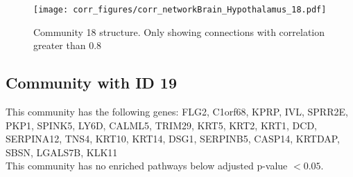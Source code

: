 \begin{figure}[h!]
\centering
\texttt{[image: corr\_figures/corr\_networkBrain\_Hypothalamus\_18.pdf]}
\caption{Community 18 structure. Only showing connections with correlation greater than 0.8}
\end{figure}




\subsection*{Community with ID 19}
This community has the following genes: FLG2, C1orf68, KPRP, IVL, SPRR2E, PKP1, SPINK5, LY6D, CALML5, TRIM29, KRT5, KRT2, KRT1, DCD, SERPINA12, TNS4, KRT10, KRT14, DSG1, SERPINB5, CASP14, KRTDAP, SBSN, LGALS7B, KLK11
\\
This community has no enriched pathways below adjusted p-value $< 0.05$.

